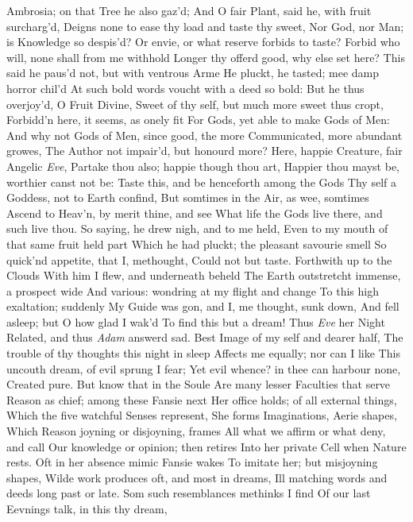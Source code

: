 \documentclass[11pt]{book}
\newcounter {last}
\begin{document}
Ambrosia; on that Tree he also gaz'd; 
And O fair Plant, said he, with fruit surcharg'd, 
Deigns none to ease thy load and taste thy sweet, 
Nor God, nor Man; is Knowledge so despis'd? 
Or envie, or what reserve forbids to taste? 
Forbid who will, none shall from me withhold 
Longer thy offerd good, why else set here? 
This said he paus'd not, but with ventrous Arme 
He pluckt, he tasted; mee damp horror chil'd 
At such bold words voucht with a deed so bold: 
But he thus overjoy'd, O Fruit Divine, 
Sweet of thy self, but much more sweet thus cropt, 
Forbidd'n here, it seems, as onely fit 
For Gods, yet able to make Gods of Men: 
And why not Gods of Men, since good, the more 
Communicated, more abundant growes, 
The Author not impair'd, but honourd more? 
Here, happie Creature, fair Angelic \textit{Eve}, 
Partake thou also; happie though thou art, 
Happier thou mayst be, worthier canst not be: 
Taste this, and be henceforth among the Gods 
Thy self a Goddess, not to Earth confind, 
But somtimes in the Air, as wee, somtimes 
Ascend to Heav'n, by merit thine, and see 
What life the Gods live there, and such live thou. 
So saying, he drew nigh, and to me held, 
Even to my mouth of that same fruit held part 
Which he had pluckt; the pleasant savourie smell 
So quick'nd appetite, that I, methought, 
Could not but taste.  Forthwith up to the Clouds 
With him I flew, and underneath beheld 
The Earth outstretcht immense, a prospect wide 
And various: wondring at my flight and change 
To this high exaltation; suddenly 
My Guide was gon, and I, me thought, sunk down, 
And fell asleep; but O how glad I wak'd 
To find this but a dream!  Thus \textit{Eve} her Night 
Related, and thus \textit{Adam} answerd sad. 
\quad Best Image of my self and dearer half, 
The trouble of thy thoughts this night in sleep 
Affects me equally; nor can I like 
This uncouth dream, of evil sprung I fear; 
Yet evil whence? in thee can harbour none, 
Created pure.  But know that in the Soule 
Are many lesser Faculties that serve 
Reason as chief; among these Fansie next 
Her office holds; of all external things, 
Which the five watchful Senses represent, 
She forms Imaginations, Aerie shapes, 
Which Reason joyning or disjoyning, frames 
All what we affirm or what deny, and call 
Our knowledge or opinion; then retires 
Into her private Cell when Nature rests. 
Oft in her absence mimic Fansie wakes 
To imitate her; but misjoyning shapes, 
Wilde work produces oft, and most in dreams, 
Ill matching words and deeds long past or late. 
Som such resemblances methinks I find 
Of our last Eevnings talk, in this thy dream, 
\end{document}
